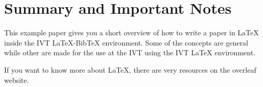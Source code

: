 %
\section{Summary and Important Notes}
%

This example paper gives you a short overview of how to write a paper
in \LaTeX{} inside the IVT \LaTeX{}-Bib\TeX{} environment. 
Some of the
concepts are general while other are made for the use at the IVT using
the IVT \LaTeX{} environment.

If you want to know more about \LaTeX, there are very resources on the overleaf website.

